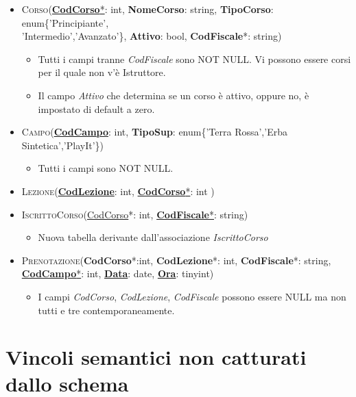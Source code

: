 \begin{itemize}
\item \textsc{Corso}(\underline{\textbf{CodCorso}*}: int, \textbf{NomeCorso}: string, \textbf{TipoCorso}: enum\{'Principiante',\\'Intermedio','Avanzato'\}, \textbf{Attivo}: bool, \textbf{CodFiscale}*: string)
\begin{itemize}
\item Tutti i campi tranne \textit{CodFiscale} sono NOT NULL. Vi possono essere corsi per il quale non v'è Istruttore.
\item Il campo \textit{Attivo} che determina se un corso è attivo, oppure no, è impostato di default a zero.
\end{itemize}
\item \textsc{Campo}(\underline{\textbf{CodCampo}}: int, \textbf{TipoSup}: enum\{'Terra Rossa','Erba Sintetica','PlayIt'\})
\begin{itemize}
\item Tutti i campi sono NOT NULL.
\end{itemize}

\item \textsc{Lezione}(\underline{\textbf{CodLezione}}: int, \underline{\textbf{CodCorso}*}: int )   
\item \textsc{IscrittoCorso}(\underline{CodCorso}*: int, \underline{\textbf{CodFiscale}*}: string) 
\begin{itemize}
\item Nuova tabella derivante dall'associazione \textit{IscrittoCorso}
\end{itemize}
\item \textsc{Prenotazione}(\textbf{CodCorso}*:int, \textbf{CodLezione}*: int, \textbf{CodFiscale}*: string, \underline{\textbf{CodCampo}*}: int, \underline{\textbf{Data}}: date, \underline{\textbf{Ora}}: tinyint)  
\begin{itemize}
\item I campi \textit{CodCorso}, \textit{CodLezione}, \textit{CodFiscale} possono essere NULL ma non tutti e tre contemporaneamente.
\end{itemize}
\end{itemize}

\section{Vincoli semantici non catturati dallo schema}
